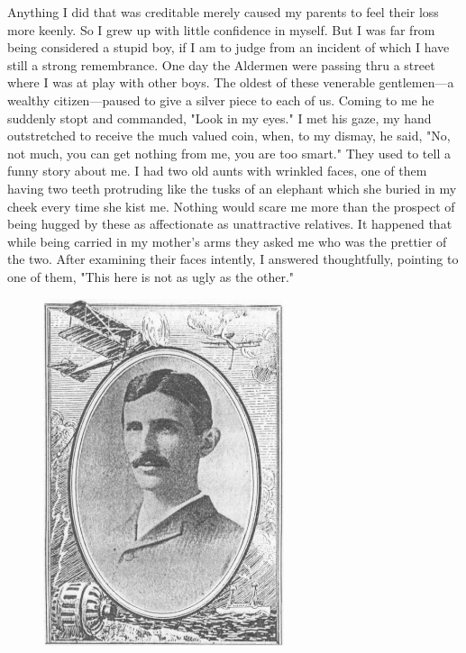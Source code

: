 \documentclass[a4paper,12pt,english,twoside,openright]{memoir}
\begin{document}
	
	Anything I did that was creditable merely caused my parents to feel their loss more keenly.  So I 
	grew up with little confidence in myself.  But I was far from being considered a stupid boy, if I am 
	to judge from an incident of which I have still a strong remembrance.  One day the Aldermen 
	were passing thru a street where I was at play with other boys.  The oldest of these venerable 
	gentlemen—a wealthy citizen—paused to give a silver piece to each of us.  Coming to me he 
	suddenly stopt and commanded, "Look in my eyes." I met his gaze, my hand outstretched to 
	receive the much valued coin, when, to my dismay, he said, "No, not much, you can get nothing 
	from me, you are too smart." They used to tell a funny story about me.  I had two old aunts with 
	wrinkled faces, one of them having two teeth protruding like the tusks of an elephant which she 
	buried in my cheek every time she kist me.  Nothing would scare me more than the prospect of 
	being hugged by these as affectionate as unattractive relatives.  It happened that while being 
	carried in my mother's arms they asked me who was the prettier of the two.  After examining their 
	faces intently, I answered thoughtfully, pointing to one of them, "This here is not as ugly as the 
	other." 
	
	\begin{figure}
		\vspace{-20pt}
		\begin{center}
			\includegraphics[width=0.63\textwidth]{Tesla-29.png}
		\end{center}
		\vspace{-20pt}
	\end{figure}
	
\end{document}
